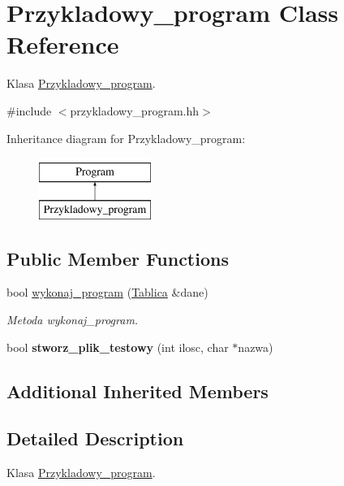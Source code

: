 \hypertarget{class_przykladowy__program}{\section{Przykladowy\+\_\+program Class Reference}
\label{class_przykladowy__program}
}


Klasa \hyperlink{class_przykladowy__program}{Przykladowy\+\_\+program}.  




{\ttfamily \#include $<$przykladowy\+\_\+program.\+hh$>$}

Inheritance diagram for Przykladowy\+\_\+program\+:\begin{figure}[H]
\begin{center}
\leavevmode
\includegraphics[height=2.000000cm]{class_przykladowy__program}
\end{center}
\end{figure}
\subsection*{Public Member Functions}
\begin{DoxyCompactItemize}
\item 
bool \hyperlink{class_przykladowy__program_a4215d5b5562be2a26f601dec4d4f6501}{wykonaj\+\_\+program} (\hyperlink{class_tablica}{Tablica} \&dane)
\begin{DoxyCompactList}\small\item\em Metoda wykonaj\+\_\+program. \end{DoxyCompactList}\item 
\hypertarget{class_przykladowy__program_a01cb33d6717d2dfd159f4607b7c8269f}{bool {\bfseries stworz\+\_\+plik\+\_\+testowy} (int ilosc, char $\ast$nazwa)}\label{class_przykladowy__program_a01cb33d6717d2dfd159f4607b7c8269f}

\end{DoxyCompactItemize}
\subsection*{Additional Inherited Members}


\subsection{Detailed Description}
Klasa \hyperlink{class_przykladowy__program}{Przykladowy\+\_\+program}. 

